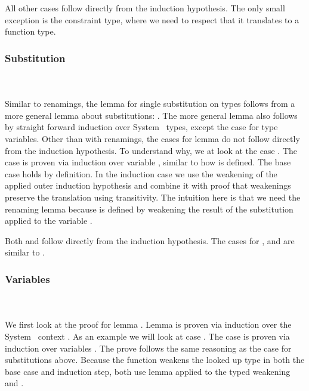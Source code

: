 \noindent All other cases follow directly from the induction hypothesis. 
The only small exception is the constraint type, where we need to respect that it translates to a function type.

\subsubsection{Substitution}\hfill\\\\
Similar to renamings, the lemma for single substitution on types  follows from a more general lemma about substitutions: \DPTTypePresSingleSub. 
The more general lemma  also follows by straight forward induction over System \Fo\ types, except the case for type variables. 
Other than with renamings, the cases for lemma  do not follow directly from the induction hypothesis. 
To understand why, we at look at the case .
\DPTVarPresSub
The case  is proven via induction over variable , similar to how  is defined. 
The base case holds by definition. 
In the induction case we use the weakening of the applied outer induction hypothesis and combine it with proof that weakenings preserve the translation using transitivity. 
The intuition here is that we need the renaming lemma  because  is defined by weakening the result of the substitution  applied to the variable .

\noindent Both  and  follow directly from the induction hypothesis. 
The cases for ,  and  are similar to .

\subsubsection{Variables}\hfill\\\\
We first look at the proof for lemma . 
Lemma  is proven via induction over the System \Fo\ context . 
\DPTVarPresLookup
As an example we will look at case   . The case is proven via induction over variables . 
The prove follows the same reasoning as the  case for substitutions above. 
Because the function  weakens the looked up type  in both the base case and induction step, both use lemma  applied to the typed weakening and . 

